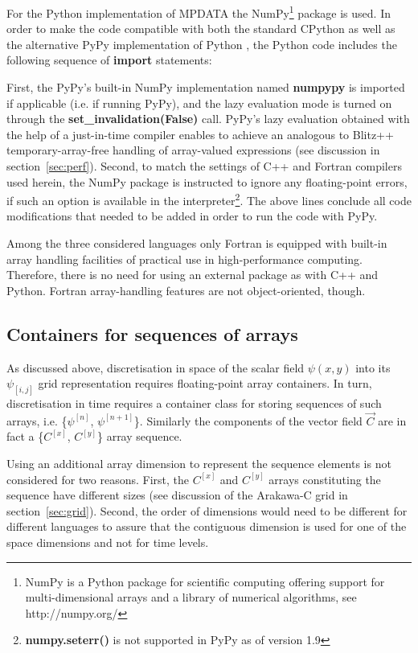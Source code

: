 \documentclass[review,peprint,10pt,5p,times]{elsarticle}
\newcounter{lstnopyt}
\newcounter{linenopyt}
\newcommand*\FancyVerbStartString{}
\newcommand*\FancyVerbStopString{}
\newcommand{\codepyt}[4]{%
  \addtocounter{lstnopyt}{1}%
  \renewcommand*\FancyVerbStartString{\PY{c}{\PYZsh{}#2}}
  \renewcommand*\FancyVerbStopString{\PY{c}{\PYZsh{}#3}}
  \setcounter{FancyVerbLine}{\thelinenopyt}%
  \fvset{label={listing~P.\thelstnopyt~(Python)},rulecolor=\color{blue},stepnumber=#4}%
  \setcounter{linenopyt}{\value{FancyVerbLine}}%
}
\newcommand{\prog}[1]{{\rm\bf#1}}
\newcommand{\url}[1]{{#1}}
\begin{document}
  For the Python implementation of MPDATA the NumPy\footnote{NumPy is a Python package
    for scientific computing offering support for multi-dimensional arrays and a library
    of numerical algorithms, see \url{http://numpy.org/}} package is used.
  In order to make the code compatible with both the standard CPython
    as well as the alternative PyPy implementation of Python \citep[][]{Bolz_et_al_2011},
    the Python code includes the following sequence of \prog{import} statements:
  \codepyt{code-pyt-listings.py}{listing02}{listing03}{1}
  First, the PyPy's built-in NumPy implementation named \prog{numpypy} is imported if applicable (i.e. if running PyPy), 
    and the lazy evaluation mode is turned on through the \prog{set\_invalidation(False)} call.
  PyPy's lazy evaluation obtained with the help of a just-in-time compiler enables to achieve
    an analogous to Blitz++ temporary-array-free handling of array-valued expressions 
    (see discussion in section~\ref{sec:perf}).
  Second, to match the settings of C++ and Fortran compilers used herein, the NumPy package is instructed 
    to ignore any floating-point errors, if such an option
    is available in the interpreter\footnote{\prog{numpy.seterr()} is not supported in PyPy as of version 1.9}.
  The above lines conclude all code modifications that needed to be added in order to run
    the code with PyPy.

  Among the three considered languages only Fortran is equipped with built-in
    array handling facilities of practical use in high-performance computing. 
  Therefore, there is no need for using an external package as with C++ and Python.
  Fortran array-handling features are not object-oriented, though.

  \subsection{Containers for sequences of arrays}\label{sec:sequence}

  As discussed above, discretisation in space of the scalar field $\psi(x,y)$ into its $\psi_{[i,j]}$ 
    grid representation requires floating-point array containers.
  In turn, discretisation in time requires a container class for storing
    sequences of such arrays, i.e. \{$\psi^{[n]}$, $\psi^{[n+1]}$\}.
  Similarly the components of the vector field $\vec{C}$ are in fact a \{$C^{[x]}$, $C^{[y]}$\} 
    array sequence.
 
  Using an additional array dimension to represent the sequence elements is not considered for two reasons.
  First, the $C^{[x]}$ and $C^{[y]}$ arrays constituting the sequence have different sizes
    (see discussion of the Arakawa-C grid in section~\ref{sec:grid}).
  Second, the order of dimensions would need to be different for different languages to assure that
    the contiguous dimension is used for one of the space dimensions and not for time levels.
\end{document}
